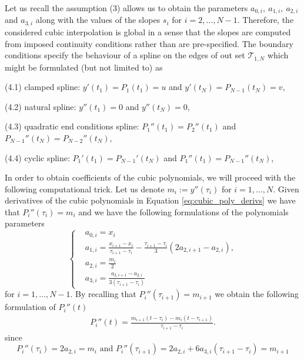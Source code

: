 \documentclass[article,moreauthors,pdftex,10pt,a4paper]{ssrn}
\begin{document}
Let us recall the assumption (3) allows us to obtain the parameters $a_{0,i},\ a_{1,i}, \ a_{2,i} $ and $a_{3,i}$ along with the values of the slopes $s_i$ for $i = 2,\ldots,N-1$. Therefore, the considered cubic interpolation is global in a sense that the slopes are computed from imposed continuity conditions rather than are pre-specified. The boundary conditions specify the behaviour of a spline on the edges of out set $ \mathcal{T}_{1,N}$ which might be formulated (but not limited to) as
\begin{description}
\item (4.1) clamped spline:  $y'(t_1)=P_1(t_1) = u$ and $y'(t_N) = P_{N-1}(t_N) = v$,
\item (4.2) natural spline: $y''(t_1) = 0$ and $y''(t_N) = 0$,
\item (4.3) quadratic end conditions spline: $P_1''(t_1) = P_2''(t_1)$ and $P_{N-1}''(t_N) =P_{N-2}''(t_N) $,
\item (4.4) cyclic spline: $P_1'(t_1) = P_{N-1}'(t_N)$ and $P_1''(t_1) = P_{N-1}''(t_N)$,
\end{description} 
In order to  obtain coefficients of the cubic polynomials, we will proceed with the following computational trick. Let us denote $m_i := y''(\tau_i)$ for $i = 1,\ldots, N$.  Given derivatives of the cubic polynomials in Equation \eqref{eq:cubic_poly_derivs} we have that $P_i''(\tau_i) = m_i$
and we have the following formulations of the polynomials parameters 
\begin{equation*}
\begin{cases}
& a_{0,i} = x_i \\
& a_{1,i} = \frac{x_{i+1} - x_i}{\tau_{i+1} - \tau_i} - \frac{\tau_{i+1} - \tau_i}{3} (2a_{2,i+1} - a_{2,i}), \\
&a_{2,i} = \frac{m_i}{2} \\
& a_{3,i} = \frac{a_{2,i+1} - a_{2,i}}{3(\tau_{i+1} - \tau_i)}
\end{cases}
\end{equation*}
for $i = 1, \ldots, N-1$.  By recalling that $P_i''(\tau_{i+1}) = m_{i+1}$  we obtain the following formulation of $P_i''(t) $
\begin{align*}
 P_i''(t) = \frac{m_{i+1} (t - \tau_i) - m_i (t - \tau_{i+1})}{\tau_{i+1} - \tau_i}.
\end{align*}
since 
\begin{equation*}
P_i''(\tau_i) =  2 a_{2,i} =  m_i \text{ and } P_i''(\tau_{i+1}) = 2 a_{2,i}  + 6a_{3,i} (\tau_{i+1} -\tau_i) =  m_{i+1} 
\end{equation*}
\end{document}
